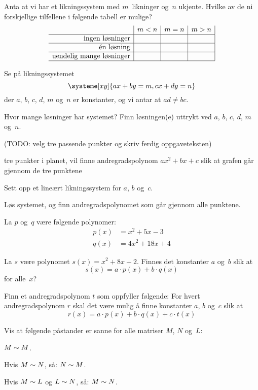 \begin{oppgave}
Anta at vi har et likningssystem med $m$~likninger og~$n$ ukjente.
Hvilke av de ni forskjellige tilfellene i følgende tabell er mulige?
\[
\begin{array}{r|c|c|c|}
                                & m < n & m = n & m > n \\ \hline
\text{ingen løsninger}          &       &       &       \\ \hline
\text{én løsning}               &       &       &       \\ \hline
\text{uendelig mange løsninger} &       &       &       \\ \hline
\end{array}
\]
\end{oppgave}


\begin{oppgave}
Se på likningssystemet
\[
\systeme[xy]{
  ax + by = m,
  cx + dy = n
}
\]
der $a$, $b$, $c$, $d$, $m$ og~$n$ er konstanter, og vi antar at $ad \ne bc$.

Hvor mange løsninger har systemet?  Finn løsningen(e) uttrykt ved $a$,
$b$, $c$, $d$, $m$ og~$n$.
\end{oppgave}


\begin{oppgave}
(TODO: velg tre passende punkter og skriv ferdig oppgaveteksten)

tre punkter i planet, vil finne andregradspolynom $ax^2 + bx + c$ slik
at grafen går gjennom de tre punktene
\begin{punkt}
Sett opp et lineært likningssystem for $a$, $b$ og~$c$.
\end{punkt}
\begin{punkt}
Løs systemet, og finn andregradspolynomet som går gjennom alle punktene.
\end{punkt}
\end{oppgave}


\begin{oppgave}
La $p$ og~$q$ være følgende polynomer:
\begin{align*}
p(x) &= x^2 + 5x - 3 \\
q(x) &= 4x^2 + 18x + 4
\end{align*}
\begin{punkt}
La $s$ være polynomet $s(x) = x^2 + 8x + 2$.  Finnes det konstanter
$a$ og~$b$ slik at
\[
s(x) = a \cdot p(x) + b \cdot q(x)
\]
for alle~$x$?
\end{punkt}
\begin{punkt}
Finn et andregradspolynom $t$ som oppfyller følgende: For hvert
andregradspolynom $r$ skal det være mulig å finne konstanter $a$, $b$
og~$c$ slik at
\[
r(x) = a \cdot p(x) + b \cdot q(x) + c \cdot t(x)
\]
\end{punkt}
\end{oppgave}


\begin{oppgave}
Vis at følgende påstander er sanne for alle matriser $M$, $N$ og~$L$:
\begin{punkt}
$M \sim M$.
\end{punkt}
\begin{punkt}
Hvis $M \sim N$, så: $N \sim M$.
\end{punkt}
\begin{punkt}
Hvis $M \sim L$ og $L \sim N$, så: $M \sim N$.
\end{punkt}
\end{oppgave}
